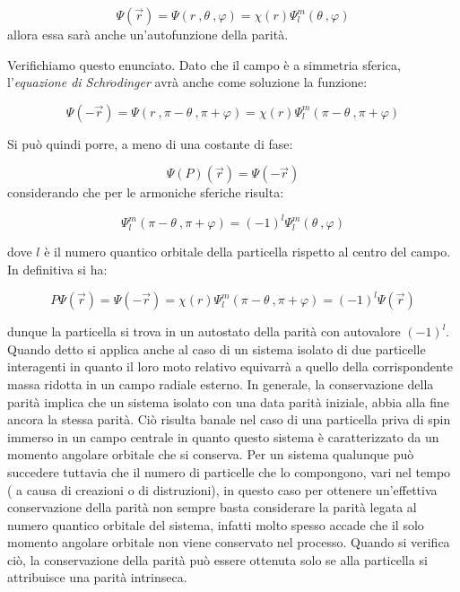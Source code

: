 \begin{equation*}
\Psi(\vec{r}) = \Psi ( r \ , \theta \ , \varphi) = \chi(r) \Psi^m_l (\theta \ , \varphi)
\end{equation*}
allora essa sarà anche un'autofunzione della parità. 

Verifichiamo questo enunciato.
Dato che il campo è a simmetria sferica, l'\textit{equazione di
  Schr$\ddot{o}$dinger} avrà anche come soluzione la funzione:

\begin{equation*}
\Psi(-\vec{r}) = \Psi ( r \ , \pi-\theta \ , \pi+\varphi) = \chi(r) \Psi^m_l (\pi-\theta \ , \pi+\varphi)
\end{equation*}

Si può quindi porre, a meno di una costante di fase:

\begin{equation*}
\Psi(P)(\vec{r}) = \Psi (-\vec{r})
\end{equation*}
considerando che per le armoniche sferiche risulta:

\begin{equation*}
\Psi^m_l (\pi-\theta \ , \pi+\varphi) = (-1)^l \Psi^m_l(\theta \ , \varphi)
\end{equation*}

dove $l$ è il numero quantico orbitale della particella rispetto al centro del
campo. In definitiva si ha:

\begin{equation*}
P \Psi(\vec{r})= \Psi (-\vec{r}) = \chi (r) \Psi^m_l (\pi - \theta \ , \pi+\varphi) = (-1)^l \Psi(\vec{r})
\end{equation*}

dunque la particella si trova in un autostato della parità con autovalore $(-1)^l$.
Quando detto si applica anche al caso di un sistema isolato di due particelle
interagenti in quanto il loro moto relativo equivarrà a quello della
corrispondente massa ridotta in un campo radiale esterno. In generale, la
conservazione della parità implica che un sistema isolato con una data parità
iniziale, abbia alla fine ancora la stessa parità. Ciò risulta banale nel caso
di una particella priva di spin immerso in un campo centrale in quanto questo
sistema è caratterizzato da un momento angolare orbitale che si conserva. Per un
sistema qualunque può succedere tuttavia che il numero di particelle che lo
compongono, vari nel tempo ( a causa di creazioni o di distruzioni), in questo
caso per ottenere un'effettiva conservazione della parità non sempre basta
considerare la parità legata al numero quantico orbitale del sistema, infatti
molto spesso accade che il solo momento angolare orbitale non viene conservato
nel processo. Quando si verifica ciò, la conservazione della parità può essere
ottenuta solo se alla particella si attribuisce una parità intrinseca.

